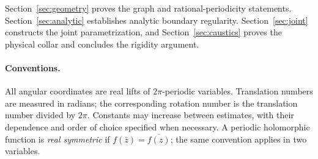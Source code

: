 Section~\ref{sec:geometry} proves the graph and rational-periodicity
statements. Section~\ref{sec:analytic} establishes analytic boundary
regularity. Section~\ref{sec:joint} constructs the joint parametrization,
and Section~\ref{sec:caustics} proves the physical collar and concludes
the rigidity argument.

\paragraph{Conventions.}
All angular coordinates are real lifts of \(2\pi\)-periodic variables.
Translation numbers are measured in radians; the corresponding rotation
number is the translation number divided by \(2\pi\).
Constants may increase between estimates, with their dependence and
order of choice specified when necessary.
A periodic holomorphic function is \emph{real symmetric} if
\(f(\bar z)=\overline{f(z)}\); the same convention applies in two variables.
